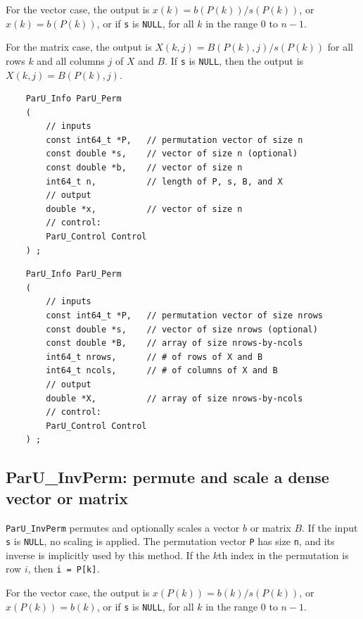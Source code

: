 \documentclass[12pt]{article}
\begin{document}
    For the vector case, the output is $x(k) = b(P(k)) / s(P(k))$, or
    $x(k) = b(P(k))$, or if \verb's' is \verb'NULL', for all $k$ in the range 0
    to $n-1$.

    For the matrix case, the output is $X(k,j) = B(P(k),j) / s(P(k))$ for all
    rows $k$ and all columns $j$ of $X$ and $B$.  If \verb's' is \verb'NULL',
    then the output is $X(k,j) = B(P(k),j)$.

    {\footnotesize
    \begin{verbatim}
    ParU_Info ParU_Perm
    (
        // inputs
        const int64_t *P,   // permutation vector of size n
        const double *s,    // vector of size n (optional)
        const double *b,    // vector of size n
        int64_t n,          // length of P, s, B, and X
        // output
        double *x,          // vector of size n
        // control:
        ParU_Control Control
    ) ; \end{verbatim} }

    {\footnotesize
    \begin{verbatim}
    ParU_Info ParU_Perm
    (
        // inputs
        const int64_t *P,   // permutation vector of size nrows
        const double *s,    // vector of size nrows (optional)
        const double *B,    // array of size nrows-by-ncols
        int64_t nrows,      // # of rows of X and B
        int64_t ncols,      // # of columns of X and B
        // output
        double *X,          // array of size nrows-by-ncols
        // control:
        ParU_Control Control
    ) ; \end{verbatim} }

\subsection{{\sf ParU\_InvPerm}: permute and scale a dense vector or matrix}
\label{invperm}

    \verb'ParU_InvPerm' permutes and optionally scales a vector $b$ or matrix
    $B$.  If the input \verb's' is \verb'NULL', no scaling is applied.  The
    permutation vector \verb'P' has size \verb'n', and its inverse is
    implicitly used by this method.  If the $k$th index in the permutation is
    row $i$, then \verb'i = P[k]'.

    For the vector case, the output is $x(P(k)) = b(k) / s(P(k))$, or
    $x(P(k)) = b(k)$, or if \verb's' is \verb'NULL', for all $k$ in the range 0
    to $n-1$.
\end{document}
